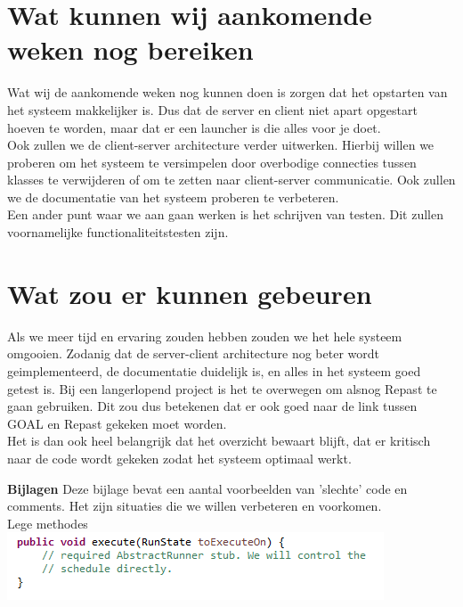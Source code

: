 \documentclass[11pt,a4paper]{article}
\begin{document}
\section{Wat kunnen wij aankomende weken nog bereiken}
Wat wij de aankomende weken nog kunnen doen is zorgen dat het opstarten van het systeem makkelijker is. Dus dat de server en client niet apart opgestart hoeven te worden, maar dat er een launcher is die alles voor je doet. \\
Ook zullen we de client-server architecture verder uitwerken. Hierbij willen we proberen om het systeem te versimpelen door overbodige connecties tussen klasses te verwijderen of om te zetten naar client-server communicatie. Ook zullen we de documentatie van het systeem proberen te verbeteren. \\
Een ander punt waar we aan gaan werken is het schrijven van testen. Dit zullen voornamelijke functionaliteitstesten zijn. 

\section{Wat zou er kunnen gebeuren}
Als we meer tijd en ervaring zouden hebben zouden we het hele systeem omgooien. Zodanig dat de server-client architecture nog beter wordt geimplementeerd, de documentatie duidelijk is, en alles in het systeem goed getest is. Bij een langerlopend project is het te overwegen om alsnog Repast te gaan gebruiken. Dit zou dus betekenen dat er ook goed naar de link tussen GOAL en Repast gekeken moet worden. \\
Het is dan ook heel belangrijk dat het overzicht bewaart blijft, dat er kritisch naar de code wordt gekeken zodat het systeem optimaal werkt.

\newpage
\textbf{Bijlagen} 
Deze bijlage bevat een aantal voorbeelden van 'slechte' code en comments. Het zijn situaties die we willen verbeteren en voorkomen. \\

Lege methodes \\
\includegraphics[width=\linewidth]{emptyMethod.png} \\ 
\end{document}
